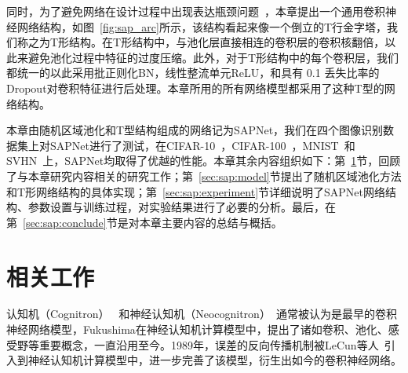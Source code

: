 同时，为了避免网络在设计过程中出现表达瓶颈问题~\cite{szegedy2015rethinking}，本章提出一个通用卷积神经网络结构，如图~\ref{fig:sap_arc}所示，该结构看起来像一个倒立的T行金字塔，我们称之为T形结构。在T形结构中，与池化层直接相连的卷积层的卷积核翻倍，以此来避免池化过程中特征的过度压缩。此外，对于T形结构中的每个卷积层，我们都统一的以此采用批正则化BN，线性整流单元ReLU，和具有 0.1 丢失比率的Dropout对卷积特征进行后处理。本章所用的所有网络模型都采用了这种T型的网络结构。

本章由随机区域池化和T型结构组成的网络记为SAPNet，我们在四个图像识别数据集上对SAPNet进行了测试，在CIFAR-10~\cite{krizhevsky2009learning}，CIFAR-100~\cite{krizhevsky2009learning}，MNIST~\cite{lecun1998gradient}和SVHN~\cite{netzer2011reading}上，SAPNet均取得了优越的性能。本章其余内容组织如下：第~\ref{sec:sap:relate}节，回顾了与本章研究内容相关的研究工作；第~\ref{sec:sap:model}节提出了随机区域池化方法和T形网络结构的具体实现；第~\ref{sec:sap:experiment}节详细说明了SAPNet网络结构、参数设置与训练过程，对实验结果进行了必要的分析。最后，在第~\ref{sec:sap:conclude}节是对本章主要内容的总结与概括。

\section{相关工作}
\label{sec:sap:relate}

认知机（Cognitron）~\cite{fukushima1975cognitron} 和神经认知机（Neocognitron）~\cite{fukushima1980neocognitron}通常被认为是最早的卷积神经网络模型，Fukushima在神经认知机计算模型中，提出了诸如卷积、池化、感受野等重要概念，一直沿用至今。1989年，误差的反向传播机制被LeCun等人~\cite{lecun1989backpropagation}引入到神经认知机计算模型中，进一步完善了该模型，衍生出如今的卷积神经网络。

